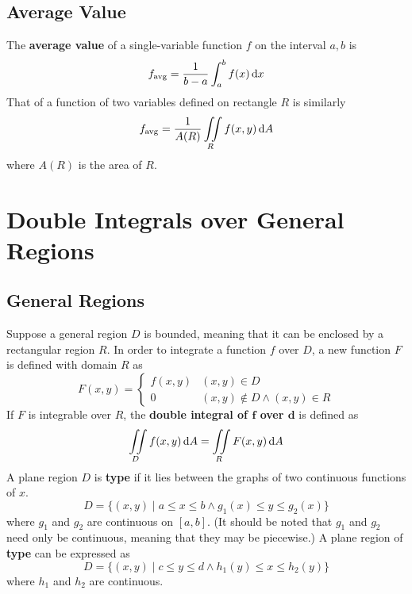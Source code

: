 \documentclass[../Calculus \Roman{3}.tex]{subfiles}
\begin{document}
		\subsection*{Average Value}
			The \textbf{average value} of a single-variable function $f$ on the interval $a, b$ is
				\[f_{\operatorname{avg}} = \frac{1}{b - a}\int_a^b f(x)\,\mathrm{d} x\]
				That of a function of two variables defined on rectangle $R$ is similarly
				\[f_{\operatorname{avg}} = \frac{1}{A(R)}\iint\limits_R f(x, y)\,\mathrm{d} A\]
				where $A(R)$ is the area of $R$.
	\section{Double Integrals over General Regions}
		\subsection*{General Regions}
			Suppose a general region $D$ is bounded, meaning that it can be enclosed by a rectangular region $R$. In order to integrate a function $f$ over $D$, a new function $F$ is defined with domain $R$ as
				\[
					F(x, y) = 
						\begin{cases}
 							f(x, y) & 
 								(x, y) \in D \\
 							0 &
 								(x, y) \notin D \land (x, y) \in R
				 		\end{cases}
				\]
				If $F$ is integrable over $R$, the \textbf{double integral of $\bm{f}$ over $\bm{d}$} is defined as
					\[\iint\limits_D f(x, y)\,\mathrm{d} A = \iint\limits_R F(x, y)\,\mathrm{d} A\]
			A plane region $D$ is \textbf{type } if it lies between the graphs of two continuous functions of $x$.
				\[D = \{(x, y) \mid a \le x \le b \land g_1(x) \le y \le g_2(x)\}\]
				where $g_1$ and $g_2$ are continuous on $[a, b]$. (It should be noted that $g_1$ and $g_2$ need only be continuous, meaning that they may be piecewise.)
			A plane region of \textbf{type } can be expressed as
				\[D = \{(x, y) \mid c \le y \le d \land h_1(y) \le x \le h_2(y)\}\]
				where $h_1$ and $h_2$ are continuous.
\end{document}

